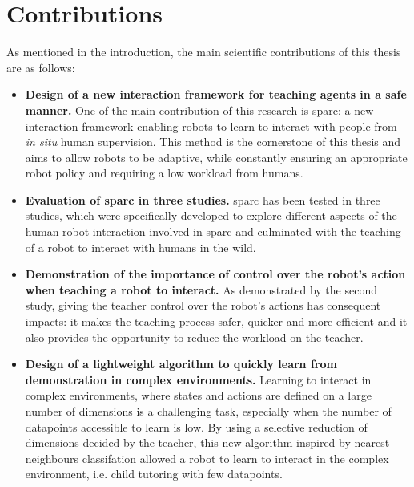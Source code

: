 \section{Contributions}\label{sec:conc_contribution}
As mentioned in the introduction, the main scientific contributions of this thesis are as follows:
\begin{itemize}
	\item \textbf{Design of a new interaction framework for teaching agents in a safe manner.} One of the main contribution of this research is \gls{sparc}: a new interaction framework enabling robots to learn to interact with people from \textit{in situ} human supervision. This method is the cornerstone of this thesis and aims to allow robots to be adaptive, while constantly ensuring an appropriate robot policy and requiring a low workload from humans.
	
	\item \textbf{Evaluation of \gls{sparc} in three studies.} \gls{sparc} has been tested in three studies, which were specifically developed to explore different aspects of the human-robot interaction involved in \gls{sparc} and culminated with the teaching of a robot to interact with humans in the wild.
	
	\item \textbf{Demonstration of the importance of control over the robot's action when teaching a robot to interact.} As demonstrated by the second study, giving the teacher control over the robot's actions has consequent impacts: it makes the teaching process safer, quicker and more efficient and it also provides the opportunity to reduce the workload on the teacher.
	
	\item \textbf{Design of a lightweight algorithm to quickly learn from demonstration in complex environments.} Learning to interact in complex environments, where states and actions are defined on a large number of dimensions is a challenging task, especially when the number of datapoints accessible to learn is low. By using a selective reduction of dimensions decided by the teacher, this new algorithm inspired by nearest neighbours classifation allowed a robot to learn to interact in the complex environment, i.e. child tutoring with few datapoints. 
	

\end{itemize}

